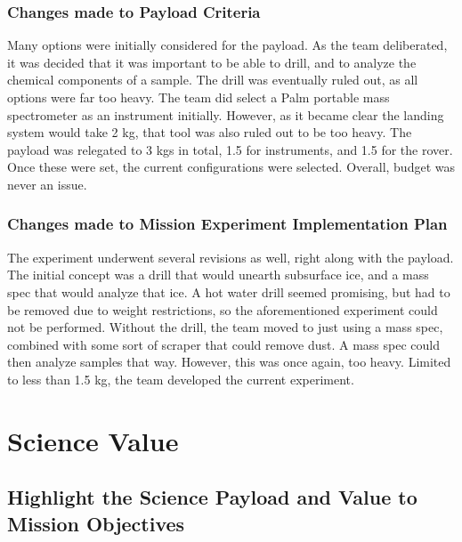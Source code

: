 \documentclass[%
 portrait,
 aapm,
 mph,%
 amsmath,amssymb,
 reprint,%
]{revtex4-2}
\begin{document}
\subsubsection{Changes made to Payload Criteria}
Many options were initially considered for the payload. As the team deliberated, it was decided that it was important to be able to drill, and to analyze the chemical components of a sample. The drill was eventually ruled out, as all options were far too heavy. The team did select a Palm portable mass spectrometer as an instrument initially. However, as it became clear the landing system would take 2 kg, that tool was also ruled out to be too heavy. The payload was relegated to 3 kgs in total, 1.5 for instruments, and 1.5 for the rover. Once these were set, the current configurations were selected. Overall, budget was never an issue. 

\subsubsection{Changes made to Mission Experiment Implementation Plan}
The experiment underwent several revisions as well, right along with the payload. The initial concept was a drill that would unearth subsurface ice, and a mass spec that would analyze that ice. A hot water drill seemed promising, but had to be removed due to weight restrictions, so the aforementioned experiment could not be performed. Without the drill, the team moved to just using a mass spec, combined with some sort of scraper that could remove dust. A mass spec could then analyze samples that way. However, this was once again, too heavy. Limited to less than 1.5 kg, the team developed the current experiment. 


\section{\label{sec:level3}Science Value}

\subsection{Highlight the Science Payload and Value to Mission Objectives}

\end{document}
